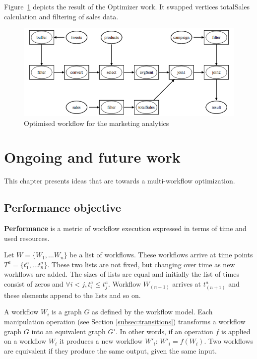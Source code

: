 \documentclass[12pt,openany,onecolumn]{book}
\begin{document}
Figure~\ref{fig:use_tweets_optimised} depicts the result of the Optimizer work. It swapped vertices totalSales calculation and filtering of sales data.
\begin{figure}
\centering
\includegraphics[width=\linewidth]{figs/tweets-o}
\caption{Optimised workflow for the marketing analytics}\label{fig:use_tweets_optimised}
\end{figure}

\chapter{Ongoing and future work}\label{chapt:future}

This chapter presents ideas that are towards a multi-workflow optimization.

\section{Performance objective}\label{sec:objectives}
\textbf{Performance} is a metric of workflow execution expressed in terms of time and used resources.

Let $W = \{W_1,\ldots W_n\}$ be a list of workflows. These workflows arrive at time points $T^a = \{t^a_1,\ldots t^a_n\}$. These two lists are not fixed, but changing over time as new workflows are added. The sizes of lists are equal and initially the list of times consist of zeros and $\forall i < j, t^a_i \leq t^a_j$. Workflow $W_{(n+1)}$ arrives at $t^a_{(n+1)}$ and these elements append to the lists and so on.

A workflow $W_i$ is a graph $G$ as defined by the workflow model. Each manipulation operation (see Section \ref{subsec:transitions}) transforms a workflow graph $G$ into an equivalent graph $G'$. In other words, if an operation $f$ is applied on a workflow $W_i$ it produces a new workflow $W'_i$: $W'_i = f(W_i)$. Two workflows are equivalent if they produce the same output, given the same input.
\end{document}
